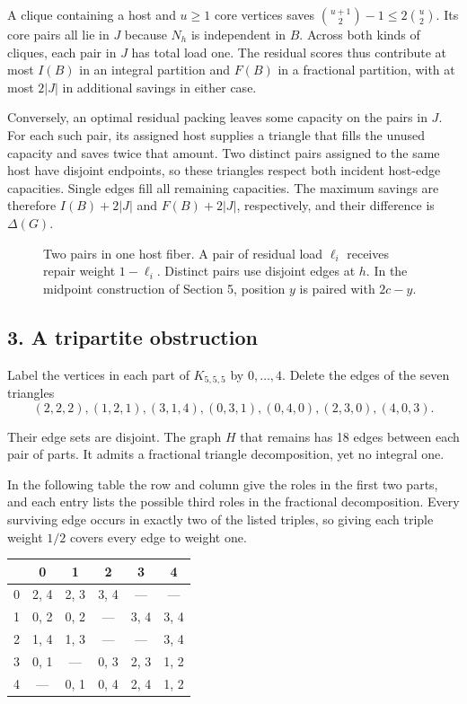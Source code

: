 \documentclass[english,11pt,a4paper]{article}
\begin{document}
A clique containing a host and \(u\ge1\) core vertices saves \(\binom{u+1}2-1\le2\binom u2\). Its core pairs all lie in \(J\) because \(N_h\) is independent in \(B\). Across both kinds of cliques, each pair in \(J\) has total load one. The residual scores thus contribute at most \(I(B)\) in an integral partition and \(F(B)\) in a fractional partition, with at most \(2|J|\) in additional savings in either case.

Conversely, an optimal residual packing leaves some capacity on the pairs in \(J\). For each such pair, its assigned host supplies a triangle that fills the unused capacity and saves twice that amount. Two distinct pairs assigned to the same host have disjoint endpoints, so these triangles respect both incident host-edge capacities. Single edges fill all remaining capacities. The maximum savings are therefore \(I(B)+2|J|\) and \(F(B)+2|J|\), respectively, and their difference is \(\Delta(G)\).

\begin{figure}[htbp]
\centering
\caption{Two pairs in one host fiber. A pair of residual load $\ell_i$ receives repair weight $1-\ell_i$. Distinct pairs use disjoint edges at $h$. In the midpoint construction of Section 5, position $y$ is paired with $2c-y$.}\label{fig:host-fiber}
\end{figure}

\subsection{3. A tripartite obstruction}\label{a-tripartite-obstruction}

Label the vertices in each part of \(K_{5,5,5}\) by \(0,\ldots,4\). Delete the edges of the seven triangles
\[(2,2,2),(1,2,1),(3,1,4),(0,3,1),(0,4,0),(2,3,0),(4,0,3).\]

Their edge sets are disjoint. The graph \(H\) that remains has 18 edges between each pair of parts. It admits a fractional triangle decomposition, yet no integral one.

In the following table the row and column give the roles in the first two parts, and each entry lists the possible third roles in the fractional decomposition. Every surviving edge occurs in exactly two of the listed triples, so giving each triple weight \(1/2\) covers every edge to weight one.

\begin{center}
\begin{tabular}{cccccc}
\toprule
 & 0 & 1 & 2 & 3 & 4 \\
\midrule
0 & 2, 4 & 2, 3 & 3, 4 & — & — \\
1 & 0, 2 & 0, 2 & — & 3, 4 & 3, 4 \\
2 & 1, 4 & 1, 3 & — & — & 3, 4 \\
3 & 0, 1 & — & 0, 3 & 2, 3 & 1, 2 \\
4 & — & 0, 1 & 0, 4 & 2, 4 & 1, 2 \\
\bottomrule
\end{tabular}
\end{center}
\end{document}
